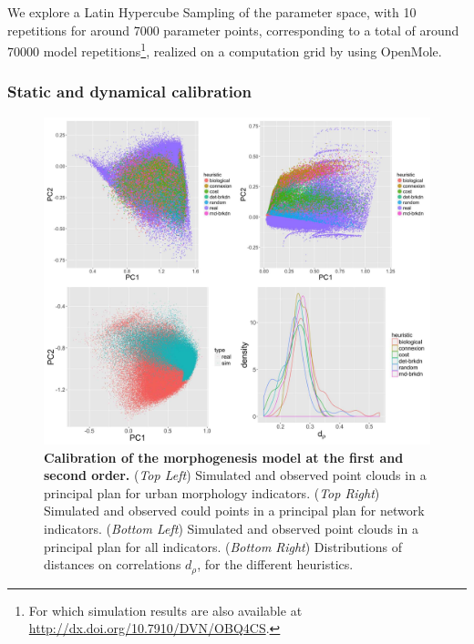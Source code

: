 We explore a Latin Hypercube Sampling of the parameter space, with 10 repetitions for around 7000 parameter points, corresponding to a total of around 70000 model repetitions\footnote{For which simulation results are also available at \url{http://dx.doi.org/10.7910/DVN/OBQ4CS}.}, realized on a computation grid by using OpenMole.





\subsubsection{Static and dynamical calibration}


\begin{figure}
	\includegraphics[width=\linewidth]{figures/7-2-2-fig-mesocoevolmodel-calibration.jpg}
	\caption{\textbf{Calibration of the morphogenesis model at the first and second order.} (\textit{Top Left}) Simulated and observed point clouds in a principal plan for urban morphology indicators. (\textit{Top Right}) Simulated and observed could points in a principal plan for network indicators. (\textit{Bottom Left}) Simulated and observed point clouds in a principal plan for all indicators. (\textit{Bottom Right}) Distributions of distances on correlations $d_{\rho}$, for the different heuristics.\label{fig:mesocoevolmodel:calibration}}
\end{figure}


